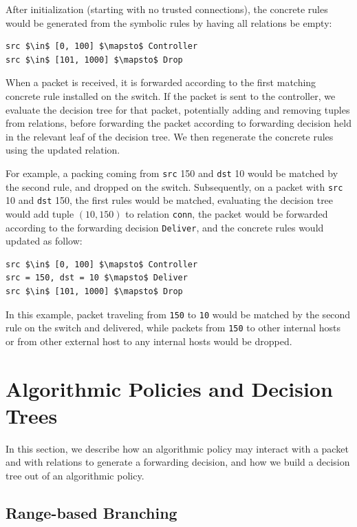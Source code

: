 \documentclass[preprint]{sigplanconf}
\begin{document}
After initialization (starting with no trusted connections), the concrete rules would be generated from the symbolic rules by having all relations be empty:
\begin{lstlisting}[mathescape]
src $\in$ [0, 100] $\mapsto$ Controller  
src $\in$ [101, 1000] $\mapsto$ Drop  
\end{lstlisting}
  

  When a packet is received, it is forwarded according to the first matching concrete rule installed on the switch. If the packet is sent to the controller, we evaluate the decision tree for that packet, potentially adding and removing tuples from relations, before forwarding the packet according to forwarding decision held in the relevant leaf of the decision tree. We then regenerate the concrete rules using the updated relation. 
  
  For example, a packing coming from \lstinline|src| 150 and \lstinline|dst| 10 would be matched by the second rule, and dropped on the switch.
Subsequently, on a packet with \lstinline|src| 10 and \lstinline|dst| 150, the first rules would be matched, evaluating the decision tree would add tuple $(10,150)$ to relation \lstinline|conn|, the packet would be forwarded according to the forwarding decision \lstinline|Deliver|, and the concrete rules would updated as follow:

\begin{lstlisting}[mathescape]
src $\in$ [0, 100] $\mapsto$ Controller  
src = 150, dst = 10 $\mapsto$ Deliver  
src $\in$ [101, 1000] $\mapsto$ Drop  
\end{lstlisting}
  
In this example, packet traveling from \lstinline|150| to \lstinline|10| would be matched by the second rule on the switch and delivered, while packets from \lstinline|150| to other internal hosts or from other external host to any internal hosts would be dropped.

\section*{Algorithmic Policies and Decision Trees}
In this section, we describe how an algorithmic policy may interact with a packet and with relations to generate a forwarding decision, and how we build a decision tree out of an algorithmic policy.

   \subsection*{Range-based Branching}
   
\end{document}
